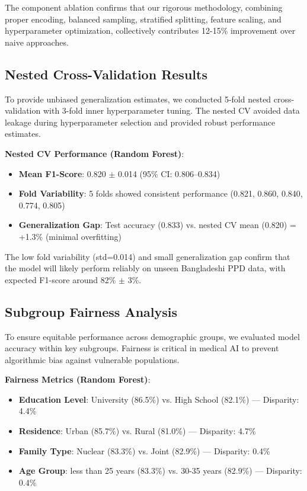 The component ablation confirms that our rigorous methodology, combining proper encoding, balanced sampling, stratified splitting, feature scaling, and hyperparameter optimization, collectively contributes 12-15\% improvement over naive approaches.

\subsection{Nested Cross-Validation Results}

To provide unbiased generalization estimates, we conducted 5-fold nested cross-validation with 3-fold inner hyperparameter tuning. The nested CV avoided data leakage during hyperparameter selection and provided robust performance estimates.

\textbf{Nested CV Performance (Random Forest)}:
\begin{itemize}
    \item \textbf{Mean F1-Score}: 0.820 $\pm$ 0.014 (95\% CI: 0.806--0.834)
    \item \textbf{Fold Variability}: 5 folds showed consistent performance (0.821, 0.860, 0.840, 0.774, 0.805)
    \item \textbf{Generalization Gap}: Test accuracy (0.833) vs. nested CV mean (0.820) = +1.3\% (minimal overfitting)
\end{itemize}

The low fold variability (std=0.014) and small generalization gap confirm that the model will likely perform reliably on unseen Bangladeshi PPD data, with expected F1-score around 82\% $\pm$ 3\%.

\subsection{Subgroup Fairness Analysis}

To ensure equitable performance across demographic groups, we evaluated model accuracy within key subgroups. Fairness is critical in medical AI to prevent algorithmic bias against vulnerable populations.

\textbf{Fairness Metrics (Random Forest)}:
\begin{itemize}
    \item \textbf{Education Level}: University (86.5\%) vs. High School (82.1\%) — Disparity: 4.4\%
    \item \textbf{Residence}: Urban (85.7\%) vs. Rural (81.0\%) — Disparity: 4.7\%
    \item \textbf{Family Type}: Nuclear (83.3\%) vs. Joint (82.9\%) — Disparity: 0.4\%
    \item \textbf{Age Group}: less than 25 years (83.3\%) vs. 30-35 years (82.9\%) — Disparity: 0.4\%
\end{itemize}

